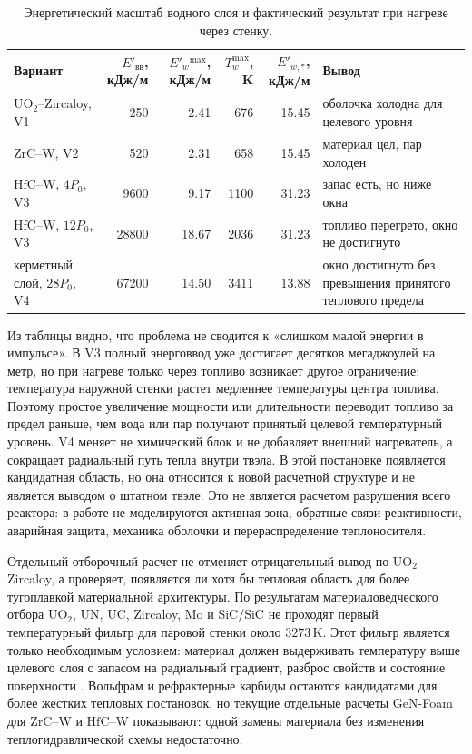 \documentclass[12pt]{article}
\begin{document}
\begin{table}[H]
    \centering
    \caption{Энергетический масштаб водного слоя и фактический результат при нагреве через стенку.}
    \label{tab:requiredPowerForDissociation}
    \small
    \renewcommand{\arraystretch}{1.15}
    \begin{tabularx}{\textwidth}{@{}XrrrrX@{}}
    \toprule
    Вариант & \(E'_{\mathrm{вв}}\), кДж/м & \(E'_w{}^{\max}\), кДж/м & \(T_w^{\max}\), K & \(E'_{w,*}\), кДж/м & Вывод \\
    \midrule
    \(\mathrm{UO_2}\)--Zircaloy, V1 & 250 & 2.41 & 676 & 15.45 & оболочка холодна для целевого уровня \\
    \(\mathrm{ZrC}\)--W, V2 & 520 & 2.31 & 658 & 15.45 & материал цел, пар холоден \\
    \(\mathrm{HfC}\)--W, \(4P_0\), V3 & 9600 & 9.17 & 1100 & 31.23 & запас есть, но ниже окна \\
    \(\mathrm{HfC}\)--W, \(12P_0\), V3 & 28800 & 18.67 & 2036 & 31.23 & топливо перегрето, окно не достигнуто \\
    керметный слой, \(28P_0\), V4 & 67200 & 14.50 & 3411 & 13.88 & окно достигнуто без превышения принятого теплового предела \\
    \bottomrule
    \end{tabularx}
\end{table}

Из таблицы видно, что проблема не сводится к «слишком малой энергии в импульсе». В V3 полный энерговвод уже достигает десятков мегаджоулей на метр, но при нагреве только через топливо возникает другое ограничение: температура наружной стенки растет медленнее температуры центра топлива. Поэтому простое увеличение мощности или длительности переводит топливо за предел раньше, чем вода или пар получают принятый целевой температурный уровень. V4 меняет не химический блок и не добавляет внешний нагреватель, а сокращает радиальный путь тепла внутри твэла. В этой постановке появляется кандидатная область, но она относится к новой расчетной структуре и не является выводом о штатном твэле. Это не является расчетом разрушения всего реактора: в работе не моделируются активная зона, обратные связи реактивности, аварийная защита, механика оболочки и перераспределение теплоносителя.

Отдельный отборочный расчет не отменяет отрицательный вывод по \(\mathrm{UO_2}\)--Zircaloy, а проверяет, появляется ли хотя бы тепловая область для более тугоплавкой материальной архитектуры. По результатам материаловедческого отбора \(\mathrm{UO_2}\), \(\mathrm{UN}\), \(\mathrm{UC}\), Zircaloy, Mo и SiC/SiC не проходят первый температурный фильтр для паровой стенки около \(3273\,\mathrm{K}\). Этот фильтр является только необходимым условием: материал должен выдерживать температуру выше целевого слоя с запасом на радиальный градиент, разброс свойств и состояние поверхности \cite{IAEATHPH2007,IAEATECDOC1496,NRC10CFR5046,LOCAOxidation,ORNLSiCSiC2018}. Вольфрам и рефрактерные карбиды остаются кандидатами для более жестких тепловых постановок, но текущие отдельные расчеты GeN-Foam для \(\mathrm{ZrC}\)--W и \(\mathrm{HfC}\)--W показывают: одной замены материала без изменения теплогидравлической схемы недостаточно.
\end{document}
